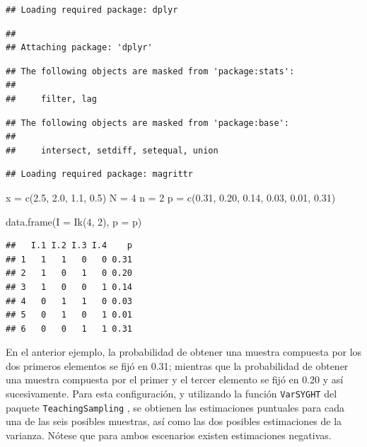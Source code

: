 \documentclass[
  10pt,
  spanish,
]{book}
\newenvironment{Shaded}{\begin{snugshade}}{\end{snugshade}}
\newcommand{\AttributeTok}[1]{\textcolor[rgb]{0.77,0.63,0.00}{#1}}
\newcommand{\DecValTok}[1]{\textcolor[rgb]{0.00,0.00,0.81}{#1}}
\newcommand{\FloatTok}[1]{\textcolor[rgb]{0.00,0.00,0.81}{#1}}
\newcommand{\FunctionTok}[1]{\textcolor[rgb]{0.00,0.00,0.00}{#1}}
\newcommand{\NormalTok}[1]{#1}
\newcommand{\OtherTok}[1]{\textcolor[rgb]{0.56,0.35,0.01}{#1}}
\begin{document}
\begin{verbatim}
## Loading required package: dplyr
\end{verbatim}

\begin{verbatim}
## 
## Attaching package: 'dplyr'
\end{verbatim}

\begin{verbatim}
## The following objects are masked from 'package:stats':
## 
##     filter, lag
\end{verbatim}

\begin{verbatim}
## The following objects are masked from 'package:base':
## 
##     intersect, setdiff, setequal, union
\end{verbatim}

\begin{verbatim}
## Loading required package: magrittr
\end{verbatim}

\begin{Shaded}
\begin{Highlighting}[]
\NormalTok{x }\OtherTok{=} \FunctionTok{c}\NormalTok{(}\FloatTok{2.5}\NormalTok{, }\FloatTok{2.0}\NormalTok{, }\FloatTok{1.1}\NormalTok{, }\FloatTok{0.5}\NormalTok{)}
\NormalTok{N }\OtherTok{=} \DecValTok{4}
\NormalTok{n }\OtherTok{=} \DecValTok{2}
\NormalTok{p }\OtherTok{=} \FunctionTok{c}\NormalTok{(}\FloatTok{0.31}\NormalTok{, }\FloatTok{0.20}\NormalTok{, }\FloatTok{0.14}\NormalTok{, }\FloatTok{0.03}\NormalTok{, }\FloatTok{0.01}\NormalTok{, }\FloatTok{0.31}\NormalTok{)}

\FunctionTok{data.frame}\NormalTok{(}\AttributeTok{I =} \FunctionTok{Ik}\NormalTok{(}\DecValTok{4}\NormalTok{, }\DecValTok{2}\NormalTok{), }\AttributeTok{p =}\NormalTok{ p)}
\end{Highlighting}
\end{Shaded}

\begin{verbatim}
##   I.1 I.2 I.3 I.4    p
## 1   1   1   0   0 0.31
## 2   1   0   1   0 0.20
## 3   1   0   0   1 0.14
## 4   0   1   1   0 0.03
## 5   0   1   0   1 0.01
## 6   0   0   1   1 0.31
\end{verbatim}

En el anterior ejemplo, la probabilidad de obtener una muestra compuesta por los dos primeros elementos se fijó en 0.31; mientras que la probabilidad de obtener una muestra compuesta por el primer y el tercer elemento se fijó en 0.20 y así sucesivamente. Para esta configuración, y utilizando la función \texttt{VarSYGHT} del paquete \texttt{TeachingSampling} \citep{TS}, se obtienen las estimaciones puntuales para cada una de las seis posibles muestras, así como las dos posibles estimaciones de la varianza. Nótese que para ambos escenarios existen estimaciones negativas.
\end{document}
